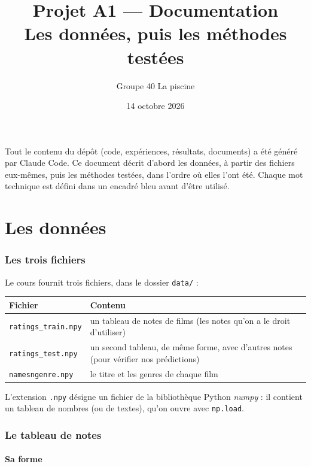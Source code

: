\documentclass[11pt,a4paper]{article}
\title{\textbf{Projet A1 --- Documentation}\\[4pt]
  \large Les données, puis les méthodes testées}
\author{Groupe 40 \og La piscine \fg{}}
\date{14 octobre 2026}
\begin{document}
\maketitle

Tout le contenu du dépôt (code, expériences, résultats, documents) a été généré par
Claude Code. Ce document décrit d'abord les données, à partir des fichiers eux-mêmes,
puis les méthodes testées, dans l'ordre où elles l'ont été. Chaque mot technique est
défini dans un encadré bleu avant d'être utilisé.

\tableofcontents

\part{Les données}

\section{Les trois fichiers}

Le cours fournit trois fichiers, dans le dossier \texttt{data/} :

\begin{center}
\begin{tabularx}{\linewidth}{@{}lX@{}}
\toprule
\textbf{Fichier} & \textbf{Contenu} \\
\midrule
\texttt{ratings\_train.npy} & un tableau de notes de films (les notes qu'on a le droit d'utiliser) \\
\texttt{ratings\_test.npy} & un second tableau, de même forme, avec d'autres notes (pour vérifier nos prédictions) \\
\texttt{namesngenre.npy} & le titre et les genres de chaque film \\
\bottomrule
\end{tabularx}
\end{center}

L'extension \texttt{.npy} désigne un fichier de la bibliothèque Python \emph{numpy} :
il contient un tableau de nombres (ou de textes), qu'on ouvre avec \texttt{np.load}.

\section{Le tableau de notes}

\subsection{Sa forme}
\end{document}
